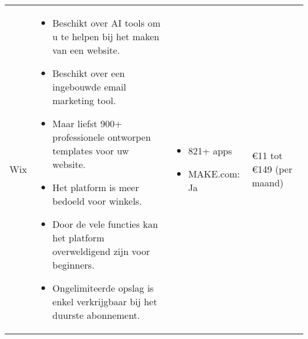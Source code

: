 \begin{longtable}{p{2.5cm} p{5.5cm} p{3.5cm} p{2.5cm}}
    Wix & 
    \vspace{-\topsep}\vspace{-\partopsep} 
    \begin{itemize}[leftmargin=2pt, topsep=0pt,parsep=0pt,noitemsep]
        \item[] Beschikt over AI tools om u te helpen bij het maken van een website.
        \item[] Beschikt over een ingebouwde email marketing tool.
        \item[] Maar liefst 900+ professionele ontworpen templates voor uw website.
    \end{itemize} 
    \begin{itemize}[leftmargin=2pt, topsep=8pt,parsep=0pt,noitemsep]
        \item[] Het platform is meer bedoeld voor winkels.
        \item[] Door de vele functies kan het platform overweldigend zijn voor beginners.
        \item[] Ongelimiteerde opslag is enkel verkrijgbaar bij het duurste abonnement.
    \end{itemize} &
    \vspace{-\topsep}\vspace{-\partopsep} 
    \begin{itemize}[leftmargin=2pt, topsep=0pt,parsep=0pt,noitemsep]
        \item[]  821+ apps
        \item[]  MAKE.com: Ja
    \end{itemize}
     &
    €11 tot €149 (per maand)\\


\end{longtable}
